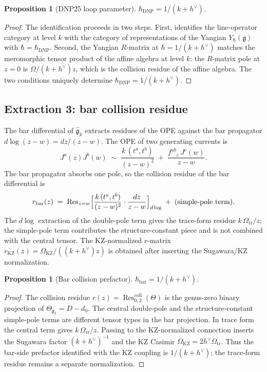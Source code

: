 \documentclass[11pt]{article}
\theoremstyle{plain}
\newtheorem{proposition}[theorem]{Proposition}
\theoremstyle{definition}
\theoremstyle{remark}
\newcommand{\fg}{\mathfrak{g}}
\newcommand{\Res}{\operatorname{Res}}
\numberwithin{equation}{section}
\begin{document}
\begin{proposition}[DNP25 loop parameter]\label{prop:dnp-loop}
$\hbar_{\mathrm{DNP}} = 1/(k + h^\vee)$.
\end{proposition}

\begin{proof}
The identification proceeds in two steps. First, \cite{DNP25}
identifies the line-operator category at level $k$ with the category
of representations of the Yangian $Y_\hbar(\fg)$ with
$\hbar = \hbar_{\mathrm{DNP}}$. Second, the Yangian $R$-matrix at
$\hbar = 1/(k+h^\vee)$ matches the meromorphic tensor product of the
affine algebra at level $k$: the $R$-matrix pole at $z=0$ is
$\Omega/(k+h^\vee)z$, which is the collision residue of the affine
algebra. The two conditions uniquely determine
$\hbar_{\mathrm{DNP}} = 1/(k+h^\vee)$.
\end{proof}

\subsection{Extraction 3: bar collision residue}

The bar differential of $\widehat{\fg}_k$ extracts residues of the
OPE against the bar propagator $d\log(z-w) = dz/(z-w)$. The OPE of
two generating currents is
\begin{equation}\label{eq:km-ope}
 J^a(z) J^b(w)
 \;\sim\;
 \frac{k \, (t^a, t^b)}{(z-w)^2}
 \;+\;
 \frac{f^{ab}{}_c \, J^c(w)}{z-w}.
\end{equation}
The bar propagator absorbs one pole, so
the collision residue of the bar differential is
\begin{equation}\label{eq:bar-collision}
 r_{\mathrm{bar}}(z)
 \;=\;
 \Res_{z=w}\Bigl[
 \frac{k \, (t^a, t^b)}{(z-w)^2}
 \cdot \frac{dz}{z-w}
 \Bigr]_{d\log}
 \;+\; \text{(simple-pole term)}.
\end{equation}
The $d\log$ extraction of the double-pole term gives the trace-form
residue $k\,\Omega_{\mathrm{tr}}/z$; the simple-pole term contributes
the structure-constant piece and is not combined with the central
tensor. The KZ-normalized $r$-matrix
$r_{\mathrm{KZ}}(z)=\Omega_{\mathrm{KZ}}/((k+h^\vee)z)$ is obtained
after inserting the Sugawara/KZ normalization.

\begin{proposition}[Bar collision prefactor]\label{prop:bar-prefactor}
$\hbar_{\mathrm{bar}} = 1/(k + h^\vee)$.
\end{proposition}

\begin{proof}
The collision residue $r(z) = \Res^{\mathrm{coll}}_{0,2}(\Theta)$
is the genus-zero binary projection of $\Theta_{\widehat{\fg}_k} =
D - d_0$. The central double-pole and the structure-constant
simple-pole terms are different tensor types in the bar projection.
In trace form the central term gives $k\,\Omega_{\mathrm{tr}}/z$.
Passing to the KZ-normalized connection inserts the Sugawara factor
$(k+h^\vee)^{-1}$ and the KZ Casimir
$\Omega_{\mathrm{KZ}}=2h^\vee\Omega_{\mathrm{tr}}$. Thus the
bar-side prefactor identified with the KZ coupling is
$1/(k+h^\vee)$; the trace-form residue remains a separate
normalization.
\end{proof}
\end{document}

